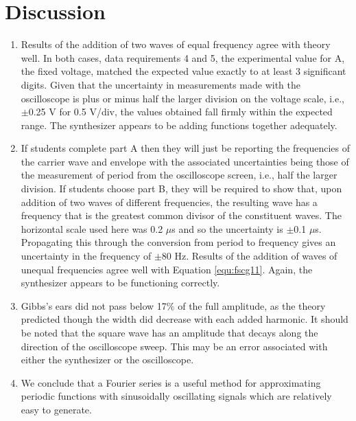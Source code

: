 \section{Discussion}
\begin{enumerate}[resume]
\item Results of the addition of two waves of equal frequency agree with theory well. In both cases, data requirements 4 and 5, the experimental value for A, the fixed voltage, matched the expected value exactly to at least 3 significant digits. Given that the uncertainty in measurements made with the oscilloscope is plus or minus half the larger division on the voltage scale, i.e., $\pm$0.25 V for 0.5 V/div, the values obtained fall firmly within the expected range. The synthesizer appears to be adding functions together adequately.

\item If students complete part A then they will just be reporting the frequencies of the carrier wave and envelope with the associated uncertainties being those of the measurement of period from the oscilloscope screen, i.e., half the larger division. If students choose part B, they will be required to show that, upon addition of two waves of different frequencies, the resulting wave has a frequency that is the greatest common divisor of the constituent waves. The horizontal scale used here was 0.2 $\mu$s and so the uncertainty is $\pm$0.1 $\mu$s. Propagating this through the conversion from period to frequency gives an uncertainty in the frequency of $\pm$80 Hz. Results of the addition of waves of unequal frequencies agree well with Equation \ref{equ:fscg11}. Again, the synthesizer appears to be functioning correctly.

\item Gibbs's ears did not pass below 17\% of the full amplitude, as the theory predicted though the width did decrease with each added harmonic. It should be noted that the square wave has an amplitude that decays along the direction of the oscilloscope sweep. This may be an error associated with either the synthesizer or the oscilloscope.

\item We conclude that a Fourier series is a useful method for approximating periodic functions with sinusoidally oscillating signals which are relatively easy to generate.


\end{enumerate}

\AtEndDocument{\clearpage\ifodd\value{page}\else\null\clearpage\fi} %


